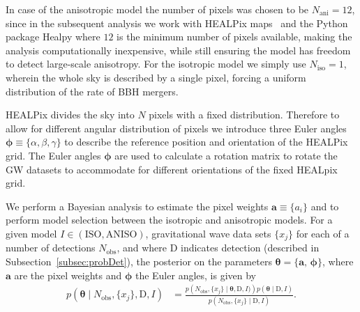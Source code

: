 \documentclass[usenatbib,useAMS]{mnras}
\newcommand{\Nobs}{\ensuremath{N_\mathrm{obs}}}
\begin{document}
In case of the anisotropic model the number of pixels was chosen to be
$N_{\mathrm{ani}}=12$, since in the subsequent analysis we work with HEALPix
maps~\citep{2005ApJ...622..759G} and the Python package Healpy where $12$ is
the minimum number of pixels available, making the analysis computationally
inexpensive, while still ensuring the model has freedom to detect large-scale
anisotropy. For the isotropic model we simply use $N_{\mathrm{iso}}=1$, wherein
the whole sky is described by a single pixel, forcing a uniform distribution
of the rate of \ac{BBH} mergers. 

HEALPix divides the sky into $N$ pixels with a fixed distribution.
Therefore to allow for different angular distribution of pixels we introduce
three Euler angles  $\bm{\phi}\equiv \{\alpha, \beta, \gamma\}$ to describe the
reference position and orientation of the HEALPix grid. The Euler angles
$\bm{\phi}$ are used to calculate a rotation matrix to rotate the GW datasets
to accommodate for different orientations of the fixed HEALpix grid.

We perform a Bayesian analysis to estimate the pixel weights
$\bm{a}\equiv\{a_i\}$ and to perform model selection between the isotropic and
anisotropic models. For a given model $I\in(\text{ISO},\text{ANISO})$,
gravitational wave data sets $\{x_j\}$ for each of a number of detections
$\Nobs$, and where $\bm{\mathrm{D}}$ indicates detection (described in
Subsection~\ref{subsec:probDet}), the posterior on the parameters $\bm{\theta} =
\{\bm{a},\,\bm{\phi}\}$, where $\bm{a}$ are the pixel weights and $\bm{\phi}$
the Euler angles, is given by
%
\begin{equation}\label{eq:posterior}
    \begin{split}
	p\left(\bm{\theta} \mid \Nobs,\{x_j\}, \bm{\mathrm{D}}, I\right)
    &= \frac{p\left(\Nobs, \{x_j\} \mid \bm{\theta}, \bm{\mathrm{D}}, I)\right)
    p\left(\bm{\theta}\mid \bm{\mathrm{D}}, I\right)}
    {p\left(\Nobs,\{x_j\}\mid \bm{\mathrm{D}}, I\right)}.
    \end{split}
\end{equation}
\end{document}
